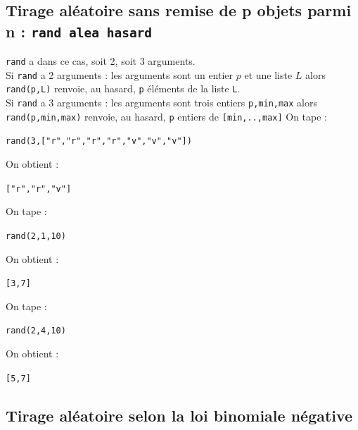 \documentclass[a4paper,11pt]{book}
\begin{document}
\subsection{Tirage al\'eatoire sans remise de p objets parmi n : {\tt rand alea hasard}}
{\tt rand} a dans ce cas, soit 2, soit  3 arguments.\\
 Si {\tt rand} a  2 arguments : les arguments sont un entier $p$ et une liste 
$L$ alors {\tt rand(p,L)} renvoie, au hasard, {\tt p} \'el\'ements de la liste 
{\tt L}.\\
 Si  {\tt rand} a  3 arguments : les arguments sont trois entiers 
{\tt p,min,max} alors
{\tt rand(p,min,max)} renvoie, au hasard, {\tt p} entiers de  
{\tt [min,..,max]} 
On tape :
\begin{center}{\tt rand(3,["r","r","r","r","v","v","v"])}\end{center}
On obtient :
\begin{center}{\tt  ["r","r","v"]}\end{center}
On tape :
\begin{center}{\tt rand(2,1,10)}\end{center}
On obtient :
\begin{center}{\tt  [3,7]}\end{center}
On tape :
\begin{center}{\tt rand(2,4,10)}\end{center}
On obtient :
\begin{center}{\tt  [5,7]}\end{center}
\subsection{Tirage al\'eatoire selon la loi binomiale n\'egative}
\end{document}
